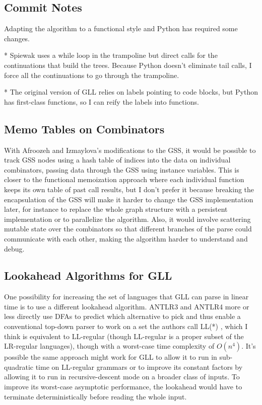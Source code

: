 \documentclass[12pt]{article}
\begin{document}
\subsection{Commit Notes}
\label{sec:commit_notes}

Adapting the algorithm to a functional style and Python has required
some changes.

* Spiewak uses a while loop in the trampoline but direct calls for the
continuations that build the trees.  Because Python doesn't eliminate
tail calls, I force all the continuations to go through the
trampoline.

* The original version of GLL relies on labels pointing to code
blocks, but Python has first-class functions, so I can reify the
labels into functions.



\subsection{Memo Tables on Combinators}
\label{sec:memo_tables}

With Afroozeh and Izmaylova's modifications to the GSS, it would be
possible to track GSS nodes using a hash table of indices into the
data on individual combinators, passing data through the GSS using
instance variables.  This is closer to the functional memoization
approach where each individual function keeps its own table of past
call results, but I don't prefer it because breaking the encapsulation
of the GSS will make it harder to change the GSS implementation later,
for instance to replace the whole graph structure with a persistent
implementation or to parallelize the algorithm.  Also, it would
involve scattering mutable state over the combinators so that
different branches of the parse could communicate with each other,
making the algorithm harder to understand and debug.



\subsection{Lookahead Algorithms for GLL}
\label{sec:gll_lookahead}

One possibility for increasing the set of languages that GLL can parse
in linear time is to use a different lookahead algorithm.  ANTLR3 and
ANTLR4 more or less directly use DFAs to predict which alternative to
pick and thus enable a conventional top-down parser to work on a set
the authors call LL(*) \parencites{antlr3, antlr4}, which I think is
equivalent to LL-regular (though LL-regular is a proper subset of the
LR-regular languages\parencite{ll-regular}), though with a worst-case
time complexity of $O(n^4)$.  It's possible the same approach might
work for GLL to allow it to run in sub-quadratic time on LL-regular
grammars or to improve its constant factors by allowing it to run in
recursive-descent mode on a broader class of inputs.  To improve its
worst-case asymptotic performance, the lookahead would have to
terminate deterministically before reading the whole input.
\end{document}
